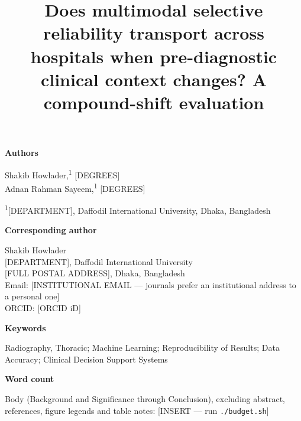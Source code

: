 \documentclass[12pt,a4paper]{article}
\title{Does multimodal selective reliability transport across hospitals when
pre-diagnostic clinical context changes? A compound-shift evaluation}
\date{}
\begin{document}
\begin{titlepage}
\thispagestyle{empty}
\nolinenumbers
\begin{singlespace}


\vspace{2em}

\noindent\textbf{Authors}

\vspace{0.5em}

\noindent Shakib Howlader,\textsuperscript{1} [DEGREES]\\
Adnan Rahman Sayeem,\textsuperscript{1} [DEGREES]

\vspace{1em}

\noindent\textsuperscript{1}[DEPARTMENT], Daffodil International University,
Dhaka, Bangladesh

\vspace{2em}

\noindent\textbf{Corresponding author}

\vspace{0.5em}

\noindent Shakib Howlader\\
{}[DEPARTMENT], Daffodil International University\\
{}[FULL POSTAL ADDRESS], Dhaka, Bangladesh\\
Email: [INSTITUTIONAL EMAIL --- journals prefer an institutional address to a
personal one]\\
ORCID: [ORCID iD]

\vspace{2em}

\noindent\textbf{Keywords}

\vspace{0.5em}

\noindent Radiography, Thoracic; Machine Learning; Reproducibility of Results;
Data Accuracy; Clinical Decision Support Systems

\vspace{2em}

\noindent\textbf{Word count}

\vspace{0.5em}

\noindent Body (Background and Significance through Conclusion), excluding
abstract, references, figure legends and table notes: [INSERT --- run
\texttt{./budget.sh}]

\end{singlespace}
\end{titlepage}
\end{document}
